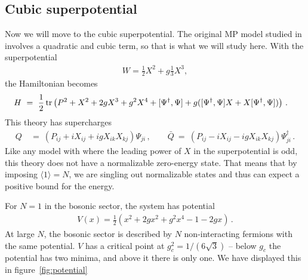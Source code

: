 \documentclass[a4paper,11pt]{article}
\newcommand{\tr}{{\rm {tr}}}
\numberwithin{equation}{section}
\begin{document}


\subsection{Cubic superpotential}

Now we will move to the cubic superpotential. The original MP model studied in \cite{Marinari:1990jc} involves a quadratic and cubic term, so that is what we will study here. With the superpotential 
%
\begin{align}
    W = \frac{1}{2} X^2 + g \frac{1}{3} X^3, 
\end{align}
%
the Hamiltonian becomes 
%
\begin{align}
    H \ &= \ 
    \frac{1}{2} \, \tr \left(  P^2 +  X^2 + 2 g X^3  + g^2 X^4  + [ \Psi^\dagger, \Psi] + 
    g  ([\Psi^\dagger, \Psi] X + X [\Psi^\dagger, \Psi]  )  \right) \, .
\end{align}
%
This theory has supercharges
%
\begin{align}
    \label{eq:superchargesbb}
    Q \ &= \  \left( P_{ij} + i X_{ij} + i g X_{ik} X_{kj} \right) \Psi_{ji} \, , \qquad 
    \bar Q \ = \ \left( P_{ij} -  i X_{ij} - i g X_{ik} X_{kj}  \right) \Psi_{ji}^\dagger \, .
\end{align}
%
Like any model with where the leading power of $X$ in the superpotential is odd, this theory does not have a normalizable zero-energy state. That means that by imposing $\langle 1 \rangle = N$, we are singling out normalizable states and thus can expect a positive bound for the energy. 

For $N = 1$ in the bosonic sector, the system has potential
%
\begin{align}
    V(x) = \frac{1}{2} \left( x^2 + 2 g x^2 + g^2 x^4 - 1 - 2  g x \right) \, . 
\end{align}
%
At large $N$, the bosonic sector is described by $N$ non-interacting fermions with the same potential. $V$ has a critical point %
at $g_c^2 = 1 / (6 \sqrt{3}) $ -- below $g_c$ the potential has two minima, and above it there is only one. We have displayed this in figure~\ref{fig:potential}
\end{document}
